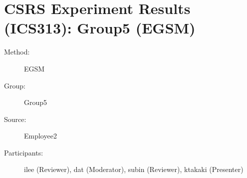 
%          
\chapter {CSRS Experiment Results (ICS313): Group5 (EGSM)}
\small
	  

\begin{description}
\item [Method:] EGSM
\item [Group:] Group5
\item [Source:] Employee2
\item [Participants:] ilee (Reviewer), dat (Moderator), subin (Reviewer), ktakaki (Presenter)
\end{description}
